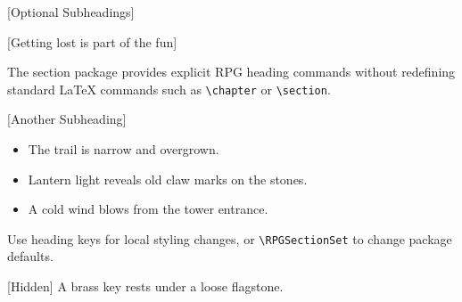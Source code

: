 \documentclass{book}
\begin{document}
[Optional Subheadings]

[Getting lost is part of the fun]

The section package provides explicit RPG heading commands without redefining
standard \LaTeX{} commands such as \verb|\chapter| or \verb|\section|.
\lipsum[1]

[Another Subheading]

\begin{itemize}
    \item The trail is narrow and overgrown.
    \item Lantern light reveals old claw marks on the stones.
    \item A cold wind blows from the tower entrance.
\end{itemize}


Use heading keys for local styling changes, or \verb|\RPGSectionSet| to change
package defaults. \lipsum[2]

[Hidden] A brass key rests under a loose flagstone.
\end{document}
